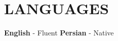 \documentclass[11pt,a4paper,roman,colorlinks,linkcolor=blue,filecolor=magenta,urlcolor=cyan]{moderncv}        %
\begin{document}
\section{LANGUAGES}
\textbf{English} - Fluent \enspace \enspace \textbf{Persian} - Native

    
    
    
      

\nocite{*}

\end{document}

